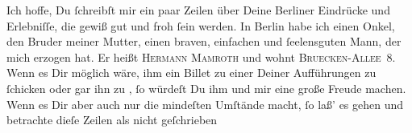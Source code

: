 \pstart
           Ich hoffe, Du{ }ſchreibſt mir ein paar Zeilen über Deine Berliner Eindrücke und Erlebniſſe, die gewiß gut und froh{ }ſein werden. In
                  Berlin habe ich einen Onkel, den Bruder meiner Mutter, einen braven, einfachen und ſeelensguten {\pb}Mann\strikeout{\textcolor{gray}{e}}, der mich erzogen hat. Er heißt \textsc{Hermann Mamroth} und wohnt \textsc{Bruecken-Allee} 8. Wenn es Dir möglich wäre, ihm ein
               Billet zu einer Deiner Aufführungen zu{ }ſchicken oder gar ihn zu \label{K_L02766-9v}\label{K_L02766-9},{ }ſo würdeſt  Du ihm und mir eine große Freude machen. Wenn es Dir
               aber auch nur die mindeſten Umſtände macht,{ }ſo laß’  es gehen {\pb}und betrachte dieſe Zeilen
               als nicht geſchrieben{\dotsfive}\pend
           
